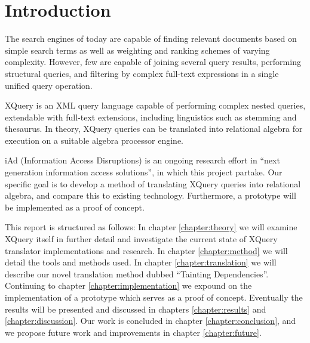 \chapter{Introduction}
\label{chapter:introduction}
% 


The search engines of today are capable of finding relevant documents based
on simple search terms as well as weighting and ranking schemes of varying
complexity. However, few are capable of joining several query results,
performing structural queries, and filtering by complex full-text expressions
in a single unified query operation. 

XQuery is an XML query language capable of performing complex nested
queries, extendable with full-text extensions, including linguistics such as
stemming and thesaurus. In theory, XQuery queries can be translated into
relational algebra for execution on a suitable algebra processor engine.

iAd \cite{iadcentre} (Information Access Disruptions) is an ongoing research
effort in ``next generation information access solutions'', in which this
project partake. Our specific goal is to develop a method of translating XQuery queries into relational algebra,
and compare this to existing technology. Furthermore, a prototype will be
implemented as a proof of concept.

This report is structured as follows:
In chapter \ref{chapter:theory} we will examine XQuery itself in further detail
and investigate the current state of XQuery translator implementations and
research. In chapter \ref{chapter:method} we will detail the tools and methods
used. In chapter \ref{chapter:translation} we will describe our novel
translation method dubbed ``Tainting Dependencies''. Continuing to chapter
\ref{chapter:implementation} we expound on the implementation of a prototype
which serves as a proof of concept. Eventually the results will be
presented and discussed in chapters \ref{chapter:results} and
\ref{chapter:discussion}. Our work is concluded in chapter
\ref{chapter:conclusion}, and we propose future work and improvements in
chapter \ref{chapter:future}.

